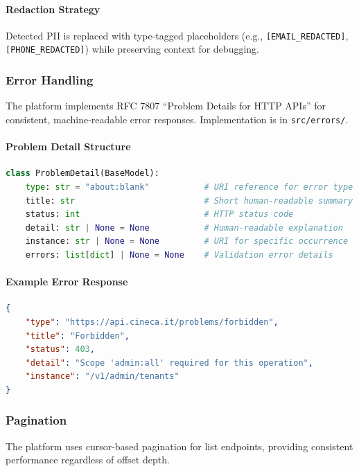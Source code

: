 \paragraph{Redaction Strategy}
Detected PII is replaced with type-tagged placeholders (e.g., \texttt{[EMAIL\_REDACTED]}, \texttt{[PHONE\_REDACTED]}) while preserving context for debugging.

\subsubsection{Error Handling}

The platform implements RFC 7807 ``Problem Details for HTTP APIs'' for consistent, machine-readable error responses. Implementation is in \texttt{src/errors/}.

\paragraph{Problem Detail Structure}
\begin{lstlisting}[language=Python, caption={RFC 7807 Problem Detail response model.}]
class ProblemDetail(BaseModel):
    type: str = "about:blank"           # URI reference for error type
    title: str                          # Short human-readable summary
    status: int                         # HTTP status code
    detail: str | None = None           # Human-readable explanation
    instance: str | None = None         # URI for specific occurrence
    errors: list[dict] | None = None    # Validation error details
\end{lstlisting}

\paragraph{Example Error Response}
\begin{lstlisting}[language=json, caption={Example 403 Forbidden error response.}]
{
    "type": "https://api.cineca.it/problems/forbidden",
    "title": "Forbidden",
    "status": 403,
    "detail": "Scope 'admin:all' required for this operation",
    "instance": "/v1/admin/tenants"
}
\end{lstlisting}

\subsubsection{Pagination}

The platform uses cursor-based pagination for list endpoints, providing consistent performance regardless of offset depth.

